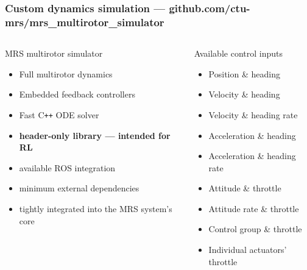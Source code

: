 \documentclass[aspectratio=169,9pt]{beamer}
\begin{document}
\begin{frame}
  \frametitle{Custom dynamics simulation --- github.com/ctu-mrs/mrs\_multirotor\_simulator}

  \vspace{-1em}

  \begin{columns}[c]


    \begin{block}{MRS multirotor simulator}
      \begin{itemize}
        \item Full multirotor dynamics
        \item Embedded feedback controllers
        \item Fast C\texttt{++} ODE solver
        \item \textbf{header-only library --- {\color{red} intended for RL}}
        \item available ROS integration
        \item minimum external dependencies
        \item tightly integrated into the MRS system's core
      \end{itemize}
    \end{block}


    \begin{block}{Available control inputs}
      \small
      \begin{itemize}
        \item Position \& heading
        \item Velocity \& heading
        \item Velocity \& heading rate
        \item Acceleration \& heading
        \item Acceleration \& heading rate
        \item Attitude \& throttle
        \item Attitude rate \& throttle
        \item Control group \& throttle
        \item Individual actuators' throttle
      \end{itemize}
    \end{block}
  \end{columns}


\end{frame}
\end{document}
